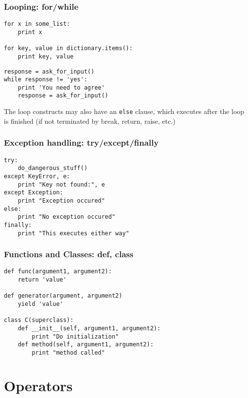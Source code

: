 \documentclass[10pt]{article}
\def\<#1>{{\tt#1}}
\begin{document}
\subsubsection{Looping: for/while}
\begin{multicols}{2}
\begin{verbatim}
for x in some_list:
    print x

for key, value in dictionary.items():
    print key, value
\end{verbatim}\columnbreak
\begin{verbatim}
response = ask_for_input()
while response != 'yes':
    print 'You need to agree'
    response = ask_for_input()
\end{verbatim}\end{multicols}
The loop constructs may also have an \<else> clause, which executes after the loop is finished (if not terminated by break, return, raise, etc.)

\begin{multicols}{2}
\subsubsection{Exception handling: try/except/finally}
\begin{verbatim}
try:
    do_dangerous_stuff()
except KeyError, e:
    print "Key not found:", e
except Exception:
    print "Exception occured"
else:
    print "No exception occured"
finally:
    print "This executes either way"
\end{verbatim}\columnbreak
\subsubsection{Functions and Classes: def, class}
\begin{verbatim}
def func(argument1, argument2):
    return 'value'

def generator(argument, argument2)
    yield 'value'

class C(superclass):
    def __init__(self, argument1, argument2):
        print "Do initialization"
    def method(self, argument1, argument2):
        print "method called"
\end{verbatim}\end{multicols}

\pagebreak
\section{Operators}
\end{document}
